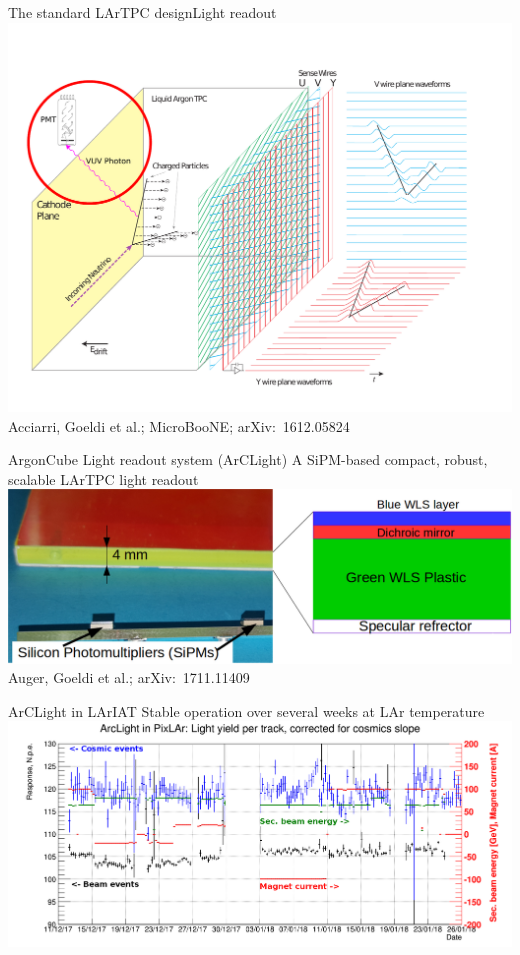\documentclass[]{beamer}
\newcommand*{\emphcoltitle}{blue}
\newcommand*{\AC}{{ArgonCube}}
\newcommand*{\AL}{{ArCLight}}
\newcommand*{\uboone}{{MicroBooNE}}
\newcommand*{\lariat}{{LArIAT}}
\newcommand*{\lar}{{LAr}}
\newcommand*{\lartpc}{{LArTPC}}
\begin{document}
\begin{frame}{The standard \lartpc{} design}{Light readout}
	\centering
	\includegraphics[viewport=30 40 720 540, clip, height=.66\textheight]{defence/TPCprinciple_light-ro}\\
	{\tiny Acciarri, Goeldi et al.; \uboone{}; arXiv:~1612.05824~\cite{uboone}}
\end{frame}

\begin{frame}{\AC{} Light readout system (\AL{})}{\color{\emphcoltitle} A SiPM-based compact, robust, scalable \lartpc{} light readout}
	\centering
	\includegraphics[width=\textwidth]{arclight/structure}\\
	{\tiny Auger, Goeldi et al.; arXiv:~1711.11409~\cite{arclight}}
\end{frame}

\begin{frame}{\AL{} in \lariat{}}{\color{\emphcoltitle} Stable operation over several weeks at \lar{} temperature}
	\centering
	\includegraphics[viewport=0 0 1648 690, clip, width=\textwidth]{arclight/stability_cosm_beam_mod}
\end{frame}
\end{document}
